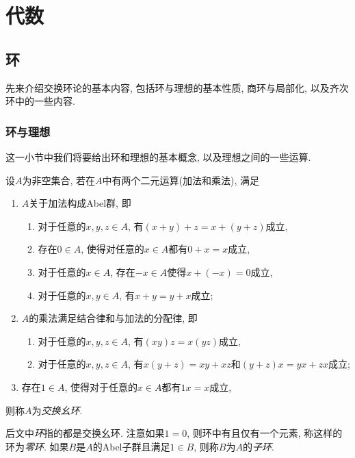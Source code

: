 
\section{代数}

\subsection{环}

先来介绍交换环论的基本内容, 包括环与理想的基本性质, 商环与局部化, 以及齐次环中的一些内容.

\subsubsection{环与理想}\label{sec:algebra-ringideal}

这一小节中我们将要给出环和理想的基本概念, 以及理想之间的一些运算.

\begin{definition}
  设$A$为非空集合, 若在$A$中有两个二元运算(加法和乘法), 满足
  \begin{enumerate}
    \item $A$关于加法构成Abel群, 即
    \begin{enumerate}
      \item 对于任意的$x, y, z\in A$, 有$(x+y)+z=x+(y+z)$成立,
      \item 存在$0\in A$, 使得对任意的$x\in A$都有$0+x=x$成立,
      \item 对于任意的$x\in A$, 存在$-x\in A$使得$x+(-x)=0$成立,
      \item 对于任意的$x, y\in A$, 有$x+y=y+x$成立;
    \end{enumerate}
    \item $A$的乘法满足结合律和与加法的分配律, 即
    \begin{enumerate}
      \item 对于任意的$x, y, z\in A$, 有$(xy)z=x(yz)$成立,
      \item 对于任意的$x, y, z\in A$, 有$x(y+z)=xy+xz$和$(y+z)x=yx+zx$成立;
    \end{enumerate}
    \item 存在$1\in A$, 使得对于任意的$x\in A$都有$1x=x$成立,
  \end{enumerate}
  则称$A$为\emph{交换幺环}.
\end{definition}

后文中\emph{环}指的都是交换幺环. 注意如果$1=0$, 则环中有且仅有一个元素, 称这样的环为\emph{零环}\footnotemark . 如果$B$是$A$的Abel子群且满足$1\in B$, 则称$B$为$A$的\emph{子环}.

